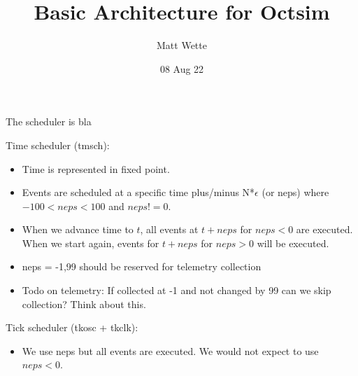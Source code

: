 \documentclass{article}
\title{%
Basic Architecture for Octsim
}
\author{Matt Wette}
\date{\large 08 Aug 22}
\begin{document}

The scheduler is bla

Time scheduler (tmsch):
\begin{itemize}
\item
  Time is represented in fixed point.
\item
  Events are scheduled at a specific time plus/minus N*$\epsilon$
  (or neps) where $-100 < neps < 100$ and $neps != 0$.
\item
  When we advance time to $t$, all events at $t + neps$ for $neps < 0$
  are executed.  When we start again, events for $t + neps$ for $neps
  > 0$ will be executed.
\item
  neps = -1,99 should be reserved for telemetry collection
\item
  Todo on telemetry:  If collected at -1 and not changed by 99 can we
  skip collection?  Think about this.
\end{itemize}

Tick scheduler (tkosc + tkclk):
\begin{itemize}
\item We use neps but all events are executed.  We would not expect to
  use $neps < 0$.
\end{itemize}
\end{document}
